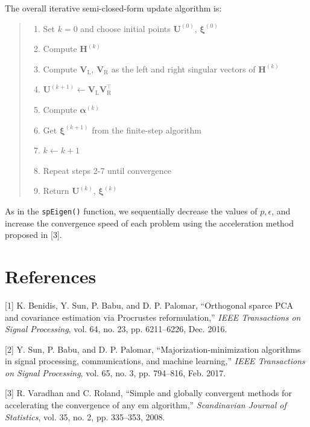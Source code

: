 \documentclass[]{article}
\providecommand{\tightlist}{%
  \setlength{\itemsep}{0pt}\setlength{\parskip}{0pt}}
\begin{document}
The overall iterative semi-closed-form update algorithm is:

\begin{quote}
\begin{enumerate}
\def\labelenumi{\arabic{enumi}.}
\tightlist
\item
  Set \(k=0\) and choose initial points \(\mathbf{U}^{(0)}\),
  \(\mathbf{\xi}^{(0)}\)\\
\item
  Compute \(\mathbf{H}^{(k)}\)\\
\item
  Compute \(\mathbf{V}_{\text{L}}\), \(\mathbf{V}_{\text{R}}\) as the
  left and right singular vectors of \(\mathbf{H}^{(k)}\)\\
\item
  \(\mathbf{U}^{(k+1)} \gets \mathbf{V}_{\text{L}}\mathbf{V}_{\text{R}}^\top\)\\
\item
  Compute \(\mathbf{\alpha}^{(k)}\)\\
\item
  Get \(\mathbf{\xi}^{(k+1)}\) from the finite-step algorithm\\
\item
  \(k \gets k+1\)\\
\item
  Repeat steps 2-7 until convergence\\
\item
  Return \(\mathbf{U}^{(k)}\), \(\mathbf{\xi}^{(k)}\)
\end{enumerate}
\end{quote}

As in the \texttt{spEigen()} function, we sequentially decrease the
values of \(p, \epsilon\), and increase the convergence speed of each
problem using the acceleration method proposed in {[}3{]}.

\section*{References}\label{references}

\setlength{\parindent}{-0.2in} \setlength{\leftskip}{0.2in}
\setlength{\parskip}{8pt} \noindent

\hypertarget{refs}{}
\hypertarget{ref-BenSunBabuPal2017}{}
{[}1{]} K. Benidis, Y. Sun, P. Babu, and D. P. Palomar, ``Orthogonal
sparce PCA and covariance estimation via Procrustes reformulation,''
\emph{IEEE Transactions on Signal Processing}, vol. 64, no. 23, pp.
6211--6226, Dec. 2016.

\hypertarget{ref-SunBabPal2018}{}
{[}2{]} Y. Sun, P. Babu, and D. P. Palomar, ``Majorization-minimization
algorithms in signal processing, communications, and machine learning,''
\emph{IEEE Transactions on Signal Processing}, vol. 65, no. 3, pp.
794--816, Feb. 2017.

\hypertarget{ref-Varadhan2008}{}
{[}3{]} R. Varadhan and C. Roland, ``Simple and globally convergent
methods for accelerating the convergence of any em algorithm,''
\emph{Scandinavian Journal of Statistics}, vol. 35, no. 2, pp. 335--353,
2008.
\end{document}
